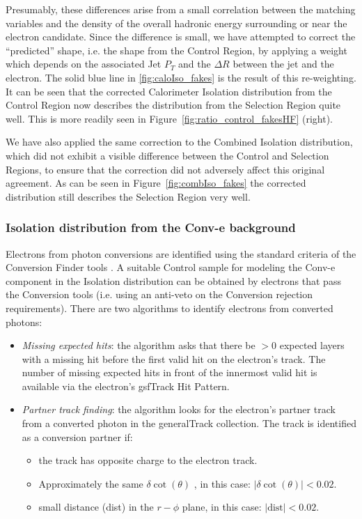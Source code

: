 Presumably, these differences arise from a small correlation between the matching variables and the density of the overall hadronic energy surrounding or near the electron candidate.  Since the difference is small, we have attempted to correct the ``predicted'' shape, i.e. the shape from the Control Region, by applying a weight which depends on the associated Jet $P_T$ and the $\Delta R$ between the jet and the electron.  The solid blue line in \ref{fig:caloIso_fakes} is the result of this re-weighting.  It can be seen that the corrected Calorimeter Isolation distribution from the Control Region now describes the distribution from the Selection Region quite well.  This is more readily seen in Figure~\ref{fig:ratio_control_fakesHF} (right).

We have also applied the same correction to the Combined Isolation distribution, which did not exhibit a visible difference between the Control and Selection Regions, to ensure that the correction did not adversely affect this original agreement.  As can be seen in Figure~\ref{fig:combIso_fakes} the corrected distribution still describes the Selection Region very well.

\subsubsection{Isolation distribution from the Conv-e background}

Electrons from photon conversions are identified using the standard criteria of the Conversion Finder tools \cite{conv}. A suitable Control sample for modeling the Conv-e component in the Isolation distribution can be obtained by electrons that pass the Conversion tools (i.e. using an anti-veto on the Conversion rejection requirements). There are two algorithms to identify electrons from converted photons:

\begin{itemize} 
\item \textit{Missing expected hits}: the algorithm asks that there be $> 0$ expected layers with a missing hit before the first valid hit on the electron's track. The number of missing expected hits in front of the innermost valid hit is available via the electron's gsfTrack Hit Pattern.
\item \textit{Partner track finding}: the algorithm looks for the electron's partner track from a converted photon in the generalTrack collection. The track is identified as a conversion partner if: 
\begin{itemize}
\item the track has opposite charge to the electron track.
\item Approximately the same $\delta \cot(\theta)$ , in this case: $|\delta \cot(\theta)| < 0.02$.
\item small distance (dist) in the $r-\phi$ plane, in this case: $|\text{dist}| < 0.02$. 
\end{itemize}
\end{itemize}


